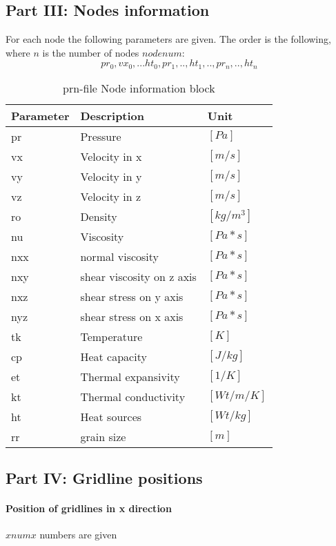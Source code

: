 \subsection{Part III: Nodes information}

For each node the following parameters are given. The order is the following, where $n$ is the number of nodes $nodenum$: $${pr_0,vx_0,...ht_0,pr_1,..,ht_1,..,pr_n,..,ht_n}$$

\begin{table}[H]
\small
\centering
\begin{tabular}{l l p{2cm}}
\toprule
Parameter & Description & Unit\\
\midrule
pr & Pressure & $[Pa]$ \\ 
vx & Velocity in x & $[m/s]$ \\ 
vy & Velocity in y & $[m/s]$ \\ 
vz & Velocity in z & $[m/s]$ \\ 
ro & Density & $[kg/m^3]$ \\ 
nu & Viscosity & $[Pa*s]$ \\ 
nxx & normal viscosity  & $[Pa*s]$ \\ 
nxy & shear viscosity on z axis & $[Pa*s]$ \\ 
nxz & shear stress on y axis & $[Pa*s]$ \\ 
nyz & shear stress on x axis & $[Pa*s]$ \\ 
tk & Temperature & $[K]$ \\ 
cp & Heat capacity & $[J/kg]$ \\ 
et & Thermal expansivity & $[1/K]$ \\ 
kt & Thermal conductivity & $[Wt/m/K]$ \\
ht  & Heat sources & $[Wt/kg]$ \\
rr  & grain size & $[m]$ \\
\bottomrule
\end{tabular}
\caption{prn-file Node information block}
\label{tbl:prn_node_info}
\end{table}

\subsection{Part IV: Gridline positions}

\paragraph{Position of gridlines in x direction} $xnumx$ numbers are given
